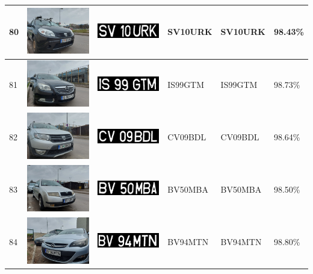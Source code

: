 \documentclass[a4paper,12pt]{report}
\begin{document}
\begin{longtable}{| m{0.6cm} | m{3cm} | m{3cm} | m{1.8cm} | m{1.8cm} | m{1.8cm} |}
        80 & \includegraphics[width=3cm,keepaspectratio]{dataset/45_s1.jpg} & \includegraphics[width=3cm,keepaspectratio]{segmentari/80.jpg} & SV10URK & SV10URK & 98.43\% \\ \hline
        81 & \includegraphics[width=3cm,keepaspectratio]{dataset/46_s1.jpg} & \includegraphics[width=3cm,keepaspectratio]{segmentari/81.jpg} & IS99GTM & IS99GTM & 98.73\% \\ \hline
        82 & \includegraphics[width=3cm,keepaspectratio]{dataset/47_s1.jpg} & \includegraphics[width=3cm,keepaspectratio]{segmentari/82.jpg} & CV09BDL & CV09BDL & 98.64\% \\ \hline
        83 & \includegraphics[width=3cm,keepaspectratio]{dataset/48_s1.jpg} & \includegraphics[width=3cm,keepaspectratio]{segmentari/83.jpg} & BV50MBA & BV50MBA & 98.50\% \\ \hline
        84 & \includegraphics[width=3cm,keepaspectratio]{dataset/49_d1.jpg} & \includegraphics[width=3cm,keepaspectratio]{segmentari/84.jpg} & BV94MTN & BV94MTN & 98.80\% \\ \hline

\end{longtable}
\end{document}
